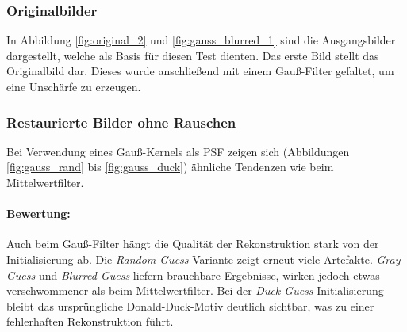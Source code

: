 \subsubsection{Originalbilder}

In Abbildung \ref{fig:original_2} und \ref{fig:gauss_blurred_1} sind die Ausgangsbilder dargestellt, welche als Basis für diesen Test dienten. Das erste Bild stellt das Originalbild dar. Dieses wurde anschließend mit einem Gauß-Filter gefaltet, um eine Unschärfe zu erzeugen.

\noindent
\begin{minipage}[t]{0.5\textwidth}
\end{minipage}
%
\begin{minipage}[t]{0.5\textwidth}
\end{minipage}

\subsubsection{Restaurierte Bilder ohne Rauschen}

Bei Verwendung eines Gauß-Kernels als PSF zeigen sich (Abbildungen \ref{fig:gauss_rand} bis \ref{fig:gauss_duck}) ähnliche Tendenzen wie beim Mittelwertfilter. 

\paragraph{Bewertung:}
Auch beim Gauß-Filter hängt die Qualität der Rekonstruktion stark von der Initialisierung ab. Die \textit{Random Guess}-Variante zeigt erneut viele Artefakte. \textit{Gray Guess} und \textit{Blurred Guess} liefern brauchbare Ergebnisse, wirken jedoch etwas verschwommener als beim Mittelwertfilter. Bei der \textit{Duck Guess}-Initialisierung bleibt das ursprüngliche Donald-Duck-Motiv deutlich sichtbar, was zu einer fehlerhaften Rekonstruktion führt.

\noindent
\begin{minipage}[t]{0.5\textwidth}
\end{minipage}
%
\begin{minipage}[t]{0.5\textwidth}
\end{minipage}

